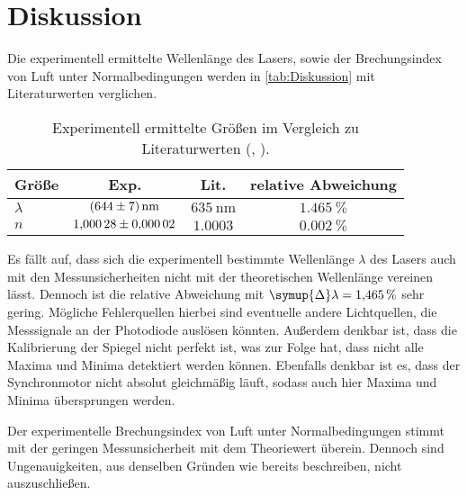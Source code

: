 \section{Diskussion}
\label{sec:Diskussion}
Die experimentell ermittelte Wellenlänge des Lasers, sowie der Brechungsindex von Luft unter Normalbedingungen 
werden in \autoref{tab:Diskussion} mit Literaturwerten verglichen.
\begin{table}[H]
    \centering
    \caption{Experimentell ermittelte Größen im Vergleich zu Literaturwerten (\cite{v401}, \cite{Brechungsindex_Wien}).}
    \label{tab:Diskussion}
    \begin{tabular}{l S S S}
        \toprule
        {Größe} & {Exp.} & {Lit.} & {relative Abweichung} \\
        \midrule
        {$\lambda$} & $\qty{644+-7}{\nano\metre}$ & $\qty{635}{\nano\metre}$  & $\qty{1.465}{\percent}$ \\
        {$n$}       & $\num{1.00028+-0.00002}$    & $\num{1,0003}$            & $\qty{0.002}{\percent}$ \\
        \bottomrule
    \end{tabular}
  \end{table}

Es fällt auf, dass sich die experimentell bestimmte Wellenlänge $\lambda$ des Lasers auch mit den Messunsicherheiten nicht
mit der theoretischen Wellenlänge vereinen lässt. Dennoch ist die relative Abweichung mit 
$\symup{\Delta}\lambda = \qty{1.465}{\percent}$ sehr gering. Mögliche Fehlerquellen hierbei sind eventuelle andere Lichtquellen,
die Messsignale an der Photodiode auslösen könnten. 
Außerdem denkbar ist, dass die Kalibrierung der Spiegel nicht perfekt ist,
was zur Folge hat, dass nicht alle Maxima und Minima detektiert werden können.
Ebenfalls denkbar ist es, dass der Synchronmotor nicht absolut gleichmäßig läuft, sodass auch hier Maxima und Minima übersprungen
werden.

Der experimentelle Brechungsindex von Luft unter Normalbedingungen stimmt mit der geringen Messunsicherheit mit dem Theoriewert
überein. Dennoch sind Ungenauigkeiten, aus denselben Gründen wie bereits beschreiben, nicht auszuschließen.